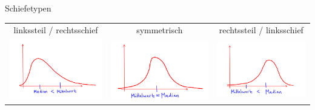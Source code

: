 \documentclass[t,11pt,aspectratio=169]{beamer}
\begin{document}
\begin{frame}
Schiefetypen
\begin{center}
	\begin{tabular}{ccc}
		linkssteil / rechtsschief & symmetrisch & rechtssteil / linksschief  \\
		\includegraphics[scale=0.15]{1.png} & \includegraphics[scale=0.15]{2.png} & \includegraphics[scale=0.15]{3.png}  
	\end{tabular} 
\end{center}
\end{frame}
\end{document}
